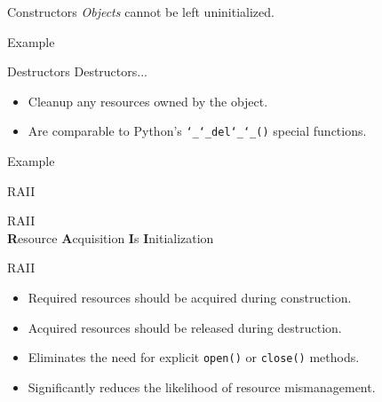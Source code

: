 \documentclass{beamer}
\begin{document}
	
	\begin{frame}{Constructors}
		\centering\textit{Objects} cannot be left uninitialized.
		\bigskip
		\begin{exampleblock}{Example}
			\lstI
		\end{exampleblock}
	\end{frame}
	
	
	\begin{frame}{Destructors}
		Destructors...
		\begin{itemize}
			\item Cleanup any resources owned by the object.
			\item Are comparable to Python's \texttt{\char`_\char`_del\char`_\char`_()} special functions.
		\end{itemize}
		\bigskip
		\begin{exampleblock}{Example}
			\lstI
		\end{exampleblock}
	\end{frame}
	
	\begin{frame}{RAII}
		\begin{center}
			\huge RAII\\
			\bigskip
			\normalsize\textbf{R}esource \textbf{A}cquisition \textbf{I}s \textbf{I}nitialization
		\end{center}
	\end{frame}
	
	\begin{frame}{RAII}
		\begin{itemize}
			\item Required resources should be acquired during construction.
			\medskip
			\item Acquired resources should be released during destruction.
			\medskip
			\item Eliminates the need for explicit \texttt{open()} or \texttt{close()} methods.
			\medskip
			\item Significantly reduces the likelihood of resource mismanagement.
		\end{itemize}
	\end{frame}
	
\end{document}
